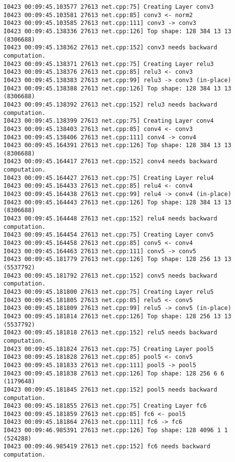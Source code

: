 \documentclass[a4]{article}
\begin{document}
\begin{lstlisting}
I0423 00:09:45.103577 27613 net.cpp:75] Creating Layer conv3
I0423 00:09:45.103581 27613 net.cpp:85] conv3 <- norm2
I0423 00:09:45.103585 27613 net.cpp:111] conv3 -> conv3
I0423 00:09:45.138336 27613 net.cpp:126] Top shape: 128 384 13 13 (8306688)
I0423 00:09:45.138362 27613 net.cpp:152] conv3 needs backward computation.
I0423 00:09:45.138371 27613 net.cpp:75] Creating Layer relu3
I0423 00:09:45.138376 27613 net.cpp:85] relu3 <- conv3
I0423 00:09:45.138383 27613 net.cpp:99] relu3 -> conv3 (in-place)
I0423 00:09:45.138388 27613 net.cpp:126] Top shape: 128 384 13 13 (8306688)
I0423 00:09:45.138392 27613 net.cpp:152] relu3 needs backward computation.
I0423 00:09:45.138399 27613 net.cpp:75] Creating Layer conv4
I0423 00:09:45.138403 27613 net.cpp:85] conv4 <- conv3
I0423 00:09:45.138406 27613 net.cpp:111] conv4 -> conv4
I0423 00:09:45.164391 27613 net.cpp:126] Top shape: 128 384 13 13 (8306688)
I0423 00:09:45.164417 27613 net.cpp:152] conv4 needs backward computation.
I0423 00:09:45.164427 27613 net.cpp:75] Creating Layer relu4
I0423 00:09:45.164433 27613 net.cpp:85] relu4 <- conv4
I0423 00:09:45.164438 27613 net.cpp:99] relu4 -> conv4 (in-place)
I0423 00:09:45.164443 27613 net.cpp:126] Top shape: 128 384 13 13 (8306688)
I0423 00:09:45.164448 27613 net.cpp:152] relu4 needs backward computation.
I0423 00:09:45.164454 27613 net.cpp:75] Creating Layer conv5
I0423 00:09:45.164458 27613 net.cpp:85] conv5 <- conv4
I0423 00:09:45.164463 27613 net.cpp:111] conv5 -> conv5
I0423 00:09:45.181779 27613 net.cpp:126] Top shape: 128 256 13 13 (5537792)
I0423 00:09:45.181792 27613 net.cpp:152] conv5 needs backward computation.
I0423 00:09:45.181800 27613 net.cpp:75] Creating Layer relu5
I0423 00:09:45.181805 27613 net.cpp:85] relu5 <- conv5
I0423 00:09:45.181809 27613 net.cpp:99] relu5 -> conv5 (in-place)
I0423 00:09:45.181814 27613 net.cpp:126] Top shape: 128 256 13 13 (5537792)
I0423 00:09:45.181818 27613 net.cpp:152] relu5 needs backward computation.
I0423 00:09:45.181824 27613 net.cpp:75] Creating Layer pool5
I0423 00:09:45.181828 27613 net.cpp:85] pool5 <- conv5
I0423 00:09:45.181833 27613 net.cpp:111] pool5 -> pool5
I0423 00:09:45.181838 27613 net.cpp:126] Top shape: 128 256 6 6 (1179648)
I0423 00:09:45.181845 27613 net.cpp:152] pool5 needs backward computation.
I0423 00:09:45.181855 27613 net.cpp:75] Creating Layer fc6
I0423 00:09:45.181859 27613 net.cpp:85] fc6 <- pool5
I0423 00:09:45.181864 27613 net.cpp:111] fc6 -> fc6
I0423 00:09:46.985391 27613 net.cpp:126] Top shape: 128 4096 1 1 (524288)
I0423 00:09:46.985419 27613 net.cpp:152] fc6 needs backward computation.

\end{lstlisting}
\end{document}
